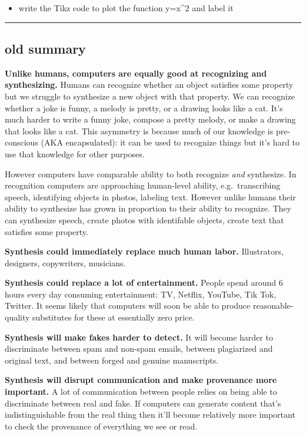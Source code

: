 \documentclass[
  11pt,
  letterpaper,
  DIV=11,
  numbers=noendperiod,
  oneside]{scrartcl}
\providecommand{\tightlist}{%
  \setlength{\itemsep}{0pt}\setlength{\parskip}{0pt}}\usepackage{longtable,booktabs,array}
\begin{document}
\begin{itemize}
\tightlist
\item
  write the Tikz code to plot the function y=x\^{}2 and label it
\end{itemize}

\begin{center}\rule{0.5\linewidth}{0.5pt}\end{center}

\hypertarget{old-summary}{%
\subsection{old summary}\label{old-summary}}

\textbf{Unlike humans, computers are equally good at recognizing and
synthesizing.} Humans can recognize whether an object satisfies some
property but we struggle to synthesize a new object with that property.
We can recognize whether a joke is funny, a melody is pretty, or a
drawing looks like a cat. It's much harder to write a funny joke,
compose a pretty melody, or make a drawing that looks like a cat. This
asymmetry is because much of our knowledge is pre-conscious (AKA
encapsulated): it can be used to recognize things but it's hard to use
that knowledge for other purposes.

However computers have comparable ability to both recognize \emph{and}
synthesize. In recognition computers are approaching human-level
ability, e.g.~transcribing speech, identifying objects in photos,
labeling text. However unlike humans their ability to synthesize has
grown in proportion to their ability to recognize. They can synthesize
speech, create photos with identifable objects, create text that
satisfies some property.

\textbf{Synthesis could immediately replace much human labor.}
Illustrators, designers, copywriters, musicians.

\textbf{Synthesis could replace a lot of entertainment.} People spend
around 6 hours every day consuming entertainment: TV, Netflix, YouTube,
Tik Tok, Twitter. It seems likely that computers will soon be able to
produce reasonable-quality substitutes for these at essentially zero
price.

\textbf{Synthesis will make fakes harder to detect.} It will become
harder to discriminate between spam and non-spam emails, between
plagiarized and original text, and between forged and genuine
manuscripts.

\textbf{Synthesis will disrupt communication and make provenance more
important.} A lot of communication between people relies on being able
to discriminate between real and fake. If computers can generate content
that's indistinguishable from the real thing then it'll become
relatively more important to check the provenance of everything we see
or read.
\end{document}
